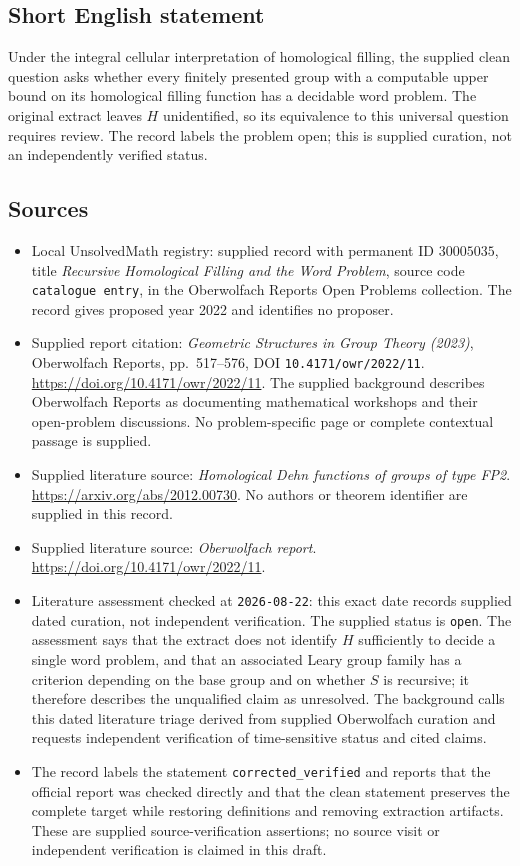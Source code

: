 \documentclass[11pt]{article}
\begin{document}
\subsection{Short English statement}
Under the integral cellular interpretation of homological filling, the supplied clean question asks whether every finitely presented group with a computable upper bound on its homological filling function has a decidable word problem. The original extract leaves \(H\) unidentified, so its equivalence to this universal question requires review. The record labels the problem open; this is supplied curation, not an independently verified status.
\subsection{Sources}
\begin{itemize}
\item Local UnsolvedMath registry: supplied record with permanent ID \(30005035\), title \emph{Recursive Homological Filling and the Word Problem}, source code \texttt{catalogue entry}, in the Oberwolfach Reports Open Problems collection. The record gives proposed year 2022 and identifies no proposer.
\item Supplied report citation: \emph{Geometric Structures in Group Theory (2023)}, Oberwolfach Reports, pp.\ 517--576, DOI \texttt{10.4171/owr/2022/11}. \url{https://doi.org/10.4171/owr/2022/11}. The supplied background describes Oberwolfach Reports as documenting mathematical workshops and their open-problem discussions. No problem-specific page or complete contextual passage is supplied.
\item Supplied literature source: \emph{Homological Dehn functions of groups of type FP2}. \url{https://arxiv.org/abs/2012.00730}. No authors or theorem identifier are supplied in this record.
\item Supplied literature source: \emph{Oberwolfach report}. \url{https://doi.org/10.4171/owr/2022/11}.
\item Literature assessment checked at \texttt{2026-08-22}: this exact date records supplied dated curation, not independent verification. The supplied status is \texttt{open}. The assessment says that the extract does not identify \(H\) sufficiently to decide a single word problem, and that an associated Leary group family has a criterion depending on the base group and on whether \(S\) is recursive; it therefore describes the unqualified claim as unresolved. The background calls this dated literature triage derived from supplied Oberwolfach curation and requests independent verification of time-sensitive status and cited claims.
\item The record labels the statement \texttt{corrected\_verified} and reports that the official report was checked directly and that the clean statement preserves the complete target while restoring definitions and removing extraction artifacts. These are supplied source-verification assertions; no source visit or independent verification is claimed in this draft.
\end{itemize}
\end{document}
